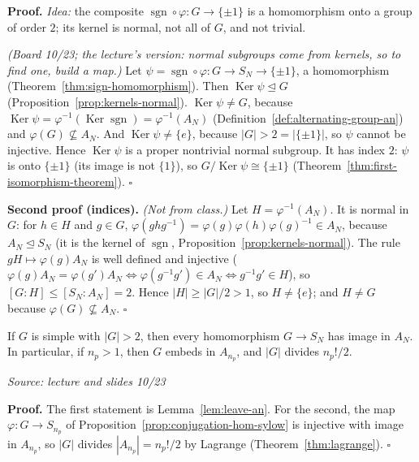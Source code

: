 \documentclass[11pt]{report}
\newcommand{\sgn}{\operatorname{sgn}}
\renewenvironment{proof}[1][Proof]{\noindent\textbf{#1.} }{\hfill$\square$\par\vspace{5pt}}
\newcommand{\srcline}[1]{\par\hfill{\footnotesize\textit{Source: #1}}}
\begin{document}
\begin{proof}
\textit{Idea:} the composite $\sgn \circ \varphi : G \to \{\pm 1\}$ is a homomorphism onto a group of order $2$; its kernel is normal, not all of $G$, and not trivial.\par
\textit{(Board 10/23; the lecture's version: normal subgroups come from kernels, so to find one, build a map.)} Let $\psi = \sgn \circ \varphi: G \to S_N \to \{\pm 1\}$, a homomorphism (Theorem~\ref{thm:sign-homomorphism}). Then $\operatorname{Ker}\psi \trianglelefteq G$ (Proposition~\ref{prop:kernels-normal}). $\operatorname{Ker}\psi \neq G$, because $\operatorname{Ker}\psi = \varphi^{-1}(\operatorname{Ker}\sgn) = \varphi^{-1}(A_N)$ (Definition~\ref{def:alternating-group-an}) and $\varphi(G) \not\subseteq A_N$. And $\operatorname{Ker}\psi \neq \{e\}$, because $|G| > 2 = |\{\pm 1\}|$, so $\psi$ cannot be injective. Hence $\operatorname{Ker}\psi$ is a proper nontrivial normal subgroup. It has index $2$: $\psi$ is onto $\{\pm 1\}$ (its image is not $\{1\}$), so $G/\operatorname{Ker}\psi \cong \{\pm 1\}$ (Theorem~\ref{thm:first-isomorphism-theorem}).
\end{proof}

\begin{proof}[Second proof (indices)]
\textit{(Not from class.)} Let $H = \varphi^{-1}(A_N)$. It is normal in $G$: for $h \in H$ and $g \in G$, $\varphi(ghg^{-1}) = \varphi(g)\varphi(h)\varphi(g)^{-1} \in A_N$, because $A_N \trianglelefteq S_N$ (it is the kernel of $\sgn$, Proposition~\ref{prop:kernels-normal}). The rule $gH \mapsto \varphi(g)A_N$ is well defined and injective ($\varphi(g)A_N = \varphi(g')A_N \iff \varphi(g^{-1}g') \in A_N \iff g^{-1}g' \in H$), so $[G : H] \leq [S_N : A_N] = 2$. Hence $|H| \geq |G|/2 > 1$, so $H \neq \{e\}$; and $H \neq G$ because $\varphi(G) \not\subseteq A_N$.
\end{proof}

\begin{corbox}\label{cor:simple-land-an}
If $G$ is simple with $|G| > 2$, then every homomorphism $G \to S_N$ has image in $A_N$. In particular, if $n_p > 1$, then $G$ embeds in $A_{n_p}$, and $|G|$ divides $n_p!/2$.
\srcline{lecture and slides 10/23}
\end{corbox}

\begin{proof}
The first statement is Lemma~\ref{lem:leave-an}. For the second, the map $\varphi: G \to S_{n_p}$ of Proposition~\ref{prop:conjugation-hom-sylow} is injective with image in $A_{n_p}$, so $|G|$ divides $|A_{n_p}| = n_p!/2$ by Lagrange (Theorem~\ref{thm:lagrange}).
\end{proof}
\end{document}
